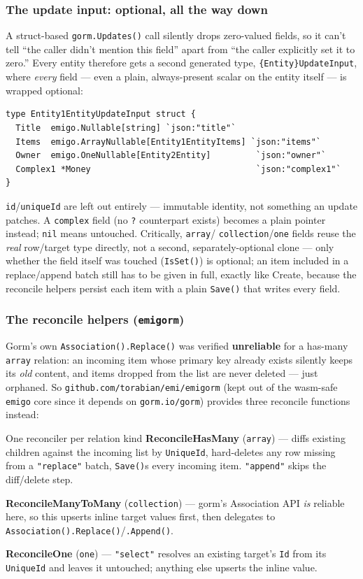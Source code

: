 \subsubsection{The update input: optional, all the way down}
A struct-based \texttt{gorm.Updates()} call silently drops zero-valued
fields, so it can't tell ``the caller didn't mention this field'' apart
from ``the caller explicitly set it to zero.'' Every entity therefore
gets a second generated type, \texttt{\{Entity\}UpdateInput}, where
\emph{every} field --- even a plain, always-present scalar on the entity
itself --- is wrapped optional:
\begin{lstlisting}
type Entity1EntityUpdateInput struct {
  Title  emigo.Nullable[string] `json:"title"`
  Items  emigo.ArrayNullable[Entity1EntityItems] `json:"items"`
  Owner  emigo.OneNullable[Entity2Entity]         `json:"owner"`
  Complex1 *Money                                 `json:"complex1"`
}
\end{lstlisting}
\texttt{id}/\texttt{uniqueId} are left out entirely --- immutable
identity, not something an update patches. A \texttt{complex} field (no
\texttt{?} counterpart exists) becomes a plain pointer instead;
\texttt{nil} means untouched. Critically, \texttt{array}/
\texttt{collection}/\texttt{one} fields reuse the \emph{real} row/target
type directly, not a second, separately-optional clone --- only whether
the field itself was touched (\texttt{IsSet()}) is optional; an item
included in a replace/append batch still has to be given in full, exactly
like Create, because the reconcile helpers persist each item with a plain
\texttt{Save()} that writes every field.

\subsubsection{The reconcile helpers (\texttt{emigorm})}
Gorm's own \texttt{Association().Replace()} was verified \textbf{unreliable}
for a has-many \texttt{array} relation: an incoming item whose primary key
already exists silently keeps its \emph{old} content, and items dropped
from the list are never deleted --- just orphaned. So
\texttt{github.com/torabian/emi/emigorm} (kept out of the wasm-safe
\texttt{emigo} core since it depends on \texttt{gorm.io/gorm}) provides
three reconcile functions instead:

\begin{sidebar}{One reconciler per relation kind}
\textbf{ReconcileHasMany} (\texttt{array}) --- diffs existing children
against the incoming list by \texttt{UniqueId}, hard-deletes any row
missing from a \texttt{"replace"} batch, \texttt{Save()}s every incoming
item. \texttt{"append"} skips the diff/delete step.

\textbf{ReconcileManyToMany} (\texttt{collection}) --- gorm's Association
API \emph{is} reliable here, so this upserts inline target values first,
then delegates to \texttt{Association().Replace()}/\texttt{.Append()}.

\textbf{ReconcileOne} (\texttt{one}) --- \texttt{"select"} resolves an
existing target's \texttt{Id} from its \texttt{UniqueId} and leaves it
untouched; anything else upserts the inline value.
\end{sidebar}


